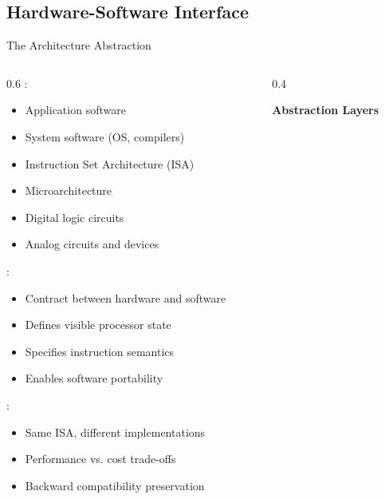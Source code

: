 \subsection{Hardware-Software Interface}

\begin{frame}{The Architecture Abstraction}
\begin{columns}
\begin{column}{0.6\textwidth}
:
\begin{itemize}
\item Application software
\item System software (OS, compilers)
\item Instruction Set Architecture (ISA)
\item Microarchitecture
\item Digital logic circuits
\item Analog circuits and devices
\end{itemize}

\vspace{0.3cm}
:
\begin{itemize}
\item Contract between hardware and software
\item Defines visible processor state
\item Specifies instruction semantics
\item Enables software portability
\end{itemize}

\vspace{0.3cm}
:
\begin{itemize}
\item Same ISA, different implementations
\item Performance vs. cost trade-offs
\item Backward compatibility preservation
\end{itemize}
\end{column}
\begin{column}{0.4\textwidth}
\begin{center}
\textbf{Abstraction Layers}
\vspace{0.3cm}

\end{center}
\end{column}
\end{columns}
\end{frame}

